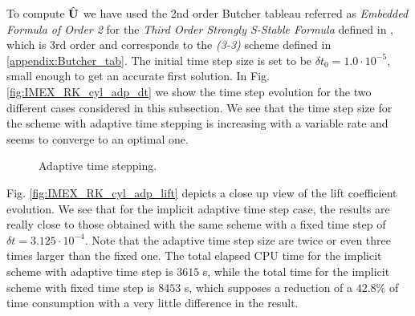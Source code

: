To compute $\hat{{\bf U}}$ we have used the 2nd order Butcher tableau referred as \textit{Embedded Formula of Order 2} for the \textit{Third Order Strongly S-Stable Formula} defined in \cite{cash_diagonally_1979}, which is 3rd order and
corresponds to the \textit{(3-3)} scheme defined in \ref{appendix:Butcher_tab}. The initial time step size is set to be $\delta t_0=1.0\cdot10^{-5}$, small enough to get an accurate first solution. In Fig. \ref{fig:IMEX_RK_cyl_adp_dt} we show the time step evolution for the two different cases considered in this subsection. We see that the time step size for the scheme with adaptive time stepping is increasing with a variable rate and seems to converge to an optimal one. %
\begin{figure}[h!]
  \centering
  \caption{Adaptive time stepping.}
  \label{fig:IMEX_RK_cyl_adp}
\end{figure}
Fig. \ref{fig:IMEX_RK_cyl_adp_lift} depicts a close up view of the lift coefficient evolution. We see that for the implicit adaptive time step case, the results are really close to those obtained with the same scheme with a fixed time step of $\delta t=3.125\cdot10^{-4}$. Note that the adaptive time step size are twice or even three times larger than the fixed one. The total elapsed CPU time for the implicit scheme with adaptive time step is $3615$ s, while the total time for the implicit scheme with fixed time step is $8453$ s, which supposes a reduction of a $42.8\%$ of time consumption with a very little difference in the result.

